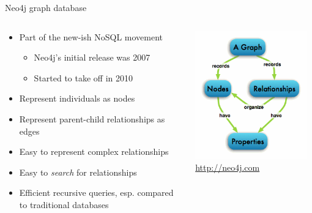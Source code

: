 \documentclass{beamer}
\newcommand{\linespace}{\vskip 0.25cm}
\begin{document}
\begin{frame}{Neo4j graph database}
	
\begin{columns} 
\begin{column}{0.65 \textwidth}
		\begin{itemize}
			\item Part of the new-ish NoSQL movement
			\begin{itemize}
				\item Neo4j's initial release was 2007
				\item Started to take off in 2010
			\end{itemize}
			\linespace
			\item Represent individuals as nodes
			\item Represent parent-child relationships as edges
			\linespace
			\item Easy to represent complex relationships
			\item Easy to \emph{search} for relationships
			\item Efficient recursive queries, esp. compared to traditional databases
		\end{itemize}
		\end{column}
		\begin{column}{0.35\textwidth}
			\centering
	   \includegraphics[width=0.95\textwidth]{Figures/graphdb-neo4j.png}
       \\
    \tiny{\url{http://neo4j.com}}
  \end{column}
  \end{columns}

\end{frame}
\end{document}

